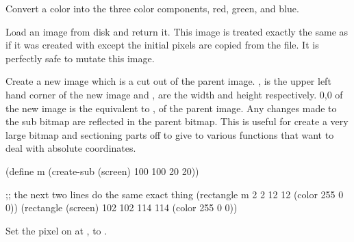 
Convert a color into the three color components, red, green, and blue.


Load an image from disk and return it. This image is treated exactly the same as if it was created with  except the initial pixels are copied from the file. It is perfectly safe to mutate this image.


Create a new image which is a cut out of the parent image. , is the upper left hand corner of the new image and ,  are the width and height respectively. 0,0 of the new image is the equivalent to , of the parent image. Any changes made to the sub bitmap are reflected in the parent bitmap. This is useful for create a very large bitmap and sectioning parts off to give to various functions that want to deal with absolute coordinates.

\begin{schemedisplay}
(define m (create-sub (screen) 100 100 20 20))

;; the next two lines do the same exact thing
(rectangle m 2 2 12 12 (color 255 0 0))
(rectangle (screen) 102 102 114 114 (color 255 0 0))
\end{schemedisplay}




Set the pixel on  at ,  to .








